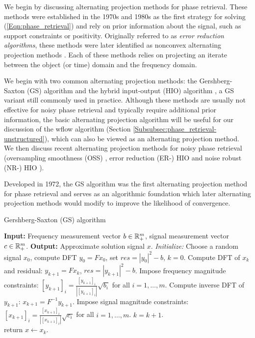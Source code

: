We begin by discussing alternating projection methods for phase retrieval.  These methods were established in the 1970s and 1980s as the first strategy for solving (\ref{Eqn:phase_retrieval}) and rely on prior information about the signal, such as support constraints or positivity.  Originally referred to as \textit{error reduction algorithms}, these methods were later identified as nonconvex alternating projection methods \cite{LeviS84}.  Each of these methods relies on projecting an iterate between the object (or time) domain and the frequency domain.  

We begin with two common alternating projection methods: the Gershberg-Saxton (GS) algorithm \cite{GS72} and the hybrid input-output (HIO) algorithm \cite{Fienup82}, a GS variant still commonly used in practice.  Although these methods are usually not effective for noisy phase retrieval and typically require additional prior information, the basic alternating projection algorithm will be useful for our discussion of the wflow algorithm \cite{DBLP:journals/tit/CandesLS15} (Section \ref{Subsubsec:phase_retrieval-unstructured}), which can also be viewed as an alternating projection method.  We then discuss recent alternating projection methods for noisy phase retrieval (oversampling smoothness (OSS) \cite{rodriguez2013oversampling}, error reduction (ER-) HIO and noise robust (NR-) HIO \cite{martin2012noise}).






Developed in 1972, the GS algorithm was the first alternating projection method for phase retrieval and serves as an algorithmic foundation which later alternating projection methods would modify to improve the likelihood of convergence.  

\begin{algorithm}[H]
\caption{Gershberg-Saxton (GS) algorithm}	\label{Alg:GS}

\begin{algorithmic}[1]
	\Statex 	\textbf{Input:} Frequency measurement vector $b \in {\mathbb R}^m_+$, signal measurement vector $c \in {\mathbb R}^m_+$.
	\Statex 	\textbf{Output:} Approximate solution signal $x$.
	\State 		\textit{Initialize:} Choose a random signal $x_0$, compute DFT $y_0 = F x_0$, set $res=|y_0|^2 - b$, $k = 0$.
		\State 	Compute DFT of $x_k$ and residual: $y_{k+1} = F x_k$, $res = |y_{k+1}|^2 - b$.
		\State	Impose frequency magnitude constraints: $[y_{k+1}]_i = \frac{[y_{k+1}]_i}{|[y_{k+1}]_i|} \sqrt{b_i}$ for all $i = 1, \ldots, m$.
		\State	Compute inverse DFT of $y_{k+1}$: $x_{k+1} = F^{-1} y_{k+1}$.
		\State	Impose signal magnitude constraints: $[x_{k+1}]_i = \frac{[x_{k+1}]_i}{|[x_{k+1}]_i|} \sqrt{c_i}$ for all $i = 1, \ldots, m$.
		\State	$k = k + 1$.
	\EndWhile	\\
	return $x \leftarrow x_k$.
\end{algorithmic}
\end{algorithm}

